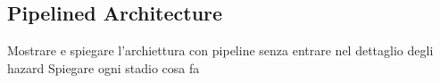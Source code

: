 \subsection{Pipelined Architecture}
Mostrare e spiegare l'archiettura con pipeline senza entrare nel dettaglio degli hazard
Spiegare ogni stadio cosa fa